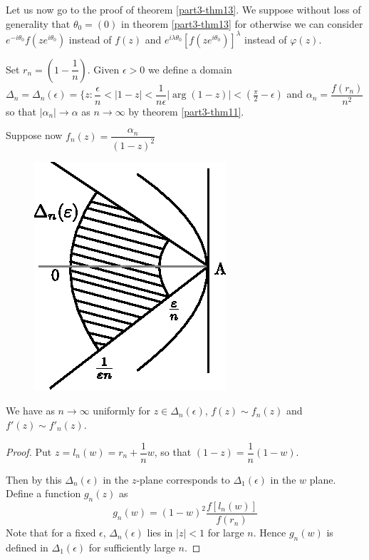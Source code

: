 Let us now go to the proof of theorem \ref{part3-thm13}. We suppose
without loss of generality that $\theta_{0}=(0)$ in theorem
\ref{part3-thm13} for otherwise we can consider
$e^{-i\theta_{0}}f(ze^{i\theta_{0}})$ instead of $f(z)$ and
$e^{i\lambda\theta_{0}}[f(ze^{i\theta_{0}})]^{\lambda}$ instead of
$\varphi(z)$.

Set $r_{n}=\left(1-\dfrac{1}{n}\right)$. Given $\epsilon>0$ we define
a domain
$\Delta_{n}=\Delta_{n}(\epsilon)=\{z:\dfrac{\epsilon}{n}<|1-z|<\dfrac{1}{n\epsilon}|\arg(1-z)|<\left(\frac{\pi}{2}-\epsilon\right)$
and $\alpha_{n}=\dfrac{f(r_{n})}{n^{2}}$ so that $|\alpha_{n}|\to
\alpha$ as $n\to \infty$ by theorem \ref{part3-thm11}.

Suppose now $f_{n}(z)=\dfrac{\alpha_{n}}{(1-z)^{2}}$
\begin{figure}[H]
\centering
\includegraphics{hayman_fig3.eps}
\end{figure}

\begin{lem}\label{part3-lem4}
We have as $n\to \infty$ uniformly for $z\in\Delta_{n}(\epsilon)$,
$f(z)\sim f_{n}(z)$ and $f'(z)\sim f'_{n}(z)$.
\end{lem}

\begin{proof}
Put $z=l_{n}(w)=r_{n}+\dfrac{1}{n}w$, so that
$(1-z)=\dfrac{1}{n}(1-w)$.

Then by this $\Delta_{n}(\epsilon)$ in the $z$-plane corresponds to
$\Delta_{1}(\epsilon)$ in the $w$ plane. Define a function $g_{n}(z)$
as
$$
g_{n}(w)=(1-w)^{2}\frac{f[l_{n}(w)]}{f(r_{n})}
$$
Note that for a fixed $\epsilon$, $\Delta_{n}(\epsilon)$ lies in
$|z|<1$ for large $n$. Hence $g_{n}(w)$ is defined in
$\Delta_{1}(\epsilon)$ for sufficiently large $n$.
\end{proof}

